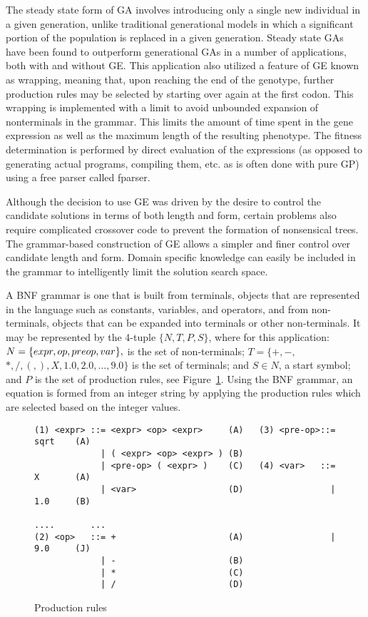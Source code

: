 \documentclass[12pt]{article}
\begin{document}
The steady state form of GA involves
introducing only a single new individual in a given generation, unlike
traditional generational models in which a significant portion of the
population is replaced in a given generation. Steady state GAs have
been found to outperform generational GAs in a number of applications,
both with and without GE. This application also utilized a feature of
GE known as wrapping, meaning that, upon reaching the end of the
genotype, further production rules may be selected by starting over
again at the first codon. This wrapping is implemented with a limit to
avoid unbounded expansion of nonterminals in the grammar. This limits
the amount of time spent in the gene expression as well as the maximum
length of the resulting phenotype. The fitness determination is
performed by direct evaluation of the expressions (as opposed to
generating actual programs, compiling them, etc. as is often done with
pure GP) using a free parser called fparser.

Although the decision to use GE was driven by the desire to control
the candidate solutions in terms of both length and form, certain
problems also require complicated crossover code to prevent the
formation of nonsensical trees. The grammar-based construction of GE
allows a simpler and finer control over candidate length and
form. Domain specific knowledge can easily be included in the grammar
to intelligently limit the solution search space.


A BNF grammar is one that is built from terminals, objects that are
represented in the language such as constants, variables, and
operators, and from non-terminals, objects that can be expanded into
terminals or other non-terminals.  It may be represented by the
4-tuple $\{ N, T, P, S \}$, where for this application: $N = \{ expr ,
op , pre\-op , var\}, $ is the set of non-terminals; $T = \{ +, - ,$
$ * , /, (, ), X, 1.0, 2.0, \dots , 9.0 \}$ is the set of terminals;
and $S \in N$, a start symbol; and $P$ is the set of production rules,
see Figure~\ref{grammar}.  Using the BNF grammar, an equation is formed from an
integer string by applying the production rules which are selected
based on the integer values.

\begin{figure}[tbh]
{\color{blue} 
{\footnotesize
\begin{verbatim}
(1) <expr> ::= <expr> <op> <expr>     (A)   (3) <pre-op>::= sqrt    (A)
             | ( <expr> <op> <expr> ) (B)
             | <pre-op> ( <expr> )    (C)   (4) <var>   ::= X       (A)
             | <var>                  (D)                 | 1.0     (B)
                                                         ....       ...
(2) <op>   ::= +                      (A)                 | 9.0     (J)
             | -                      (B)
             | *                      (C)
             | /                      (D) 
\end{verbatim}
}}
\caption{Production rules\label{grammar}}
\end{figure}
\end{document}

